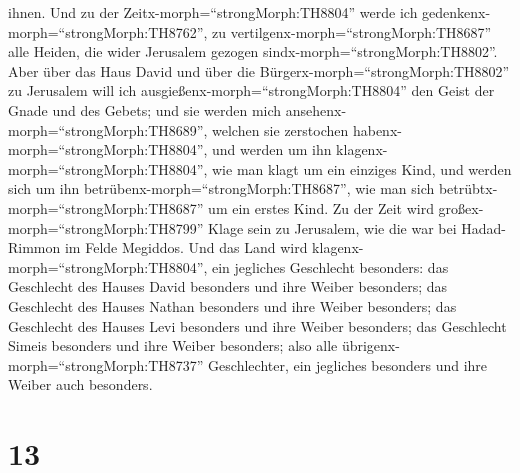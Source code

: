 ihnen.  Und zu der Zeitx-morph=``strongMorph:TH8804'' werde
ich gedenkenx-morph=``strongMorph:TH8762'', zu
vertilgenx-morph=``strongMorph:TH8687'' alle Heiden, die wider Jerusalem
gezogen sindx-morph=``strongMorph:TH8802''.  Aber über das
Haus David und über die Bürgerx-morph=``strongMorph:TH8802'' zu
Jerusalem will ich ausgießenx-morph=``strongMorph:TH8804'' den Geist der
Gnade und des Gebets; und sie werden mich
ansehenx-morph=``strongMorph:TH8689'', welchen sie zerstochen
habenx-morph=``strongMorph:TH8804'', und werden um ihn
klagenx-morph=``strongMorph:TH8804'', wie man klagt um ein einziges
Kind, und werden sich um ihn betrübenx-morph=``strongMorph:TH8687'', wie
man sich betrübtx-morph=``strongMorph:TH8687'' um ein erstes Kind.
 Zu der Zeit wird großex-morph=``strongMorph:TH8799'' Klage
sein zu Jerusalem, wie die war bei Hadad-Rimmon im Felde Megiddos.
 Und das Land wird klagenx-morph=``strongMorph:TH8804'',
ein jegliches Geschlecht besonders: das Geschlecht des Hauses David
besonders und ihre Weiber besonders; das Geschlecht des Hauses Nathan
besonders und ihre Weiber besonders;  das Geschlecht des
Hauses Levi besonders und ihre Weiber besonders; das Geschlecht Simeis
besonders und ihre Weiber besonders;  also alle
übrigenx-morph=``strongMorph:TH8737'' Geschlechter, ein jegliches
besonders und ihre Weiber auch besonders.

\hypertarget{section-12}{%
\section{13}\label{section-12}}

